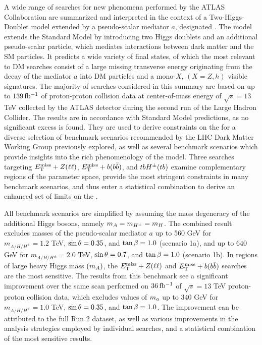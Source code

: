 A wide range of searches for new phenomena performed by the ATLAS Collaboration are summarized and interpreted in the context of a Two-Higgs-Doublet model extended by a pseudo-scalar mediator $a$, designated \hdma. The model extends the Standard Model by introducing two Higgs doublets and an additional pseudo-scalar particle, which mediates interactions between dark matter and the SM particles. It predicts a wide variety of final states, of which the most relevant to DM searches consist of a large missing transverse energy originating from the decay of the mediator $a$ into DM particles and a mono-$X,\,(X=Z,h)$ visible signatures. The majority of searches considered in this summary are based on up to $139\,\mbox{fb\(^{-1}\)}$ of proton-proton collision data at center-of-mass energy of $\sqrt{s}=13$ TeV collected by the ATLAS detector during the second run of the Large Hadron Collider. The results are in accordance with Standard Model predictions, as no significant excess is found. They are used to derive constraints on the \thdma for a diverse selection of benchmark scenarios recommended by the LHC Dark Matter Working Group previously explored, as well as several benchmark scenarios which provide insights into the rich phenomenology of the model. Three searches targeting $E_{\mathrm{T}}^{\mathrm{miss}}+Z(\ell\ell)$, $E_{\mathrm{T}}^{\mathrm{miss}}+b(b\bar{b})$, and $tbH^{\pm}(tb)$ examine complementary regions of the parameter space, provide the most stringent constraints in many benchmark scenarios, and thus enter a statistical combination to derive an enhanced set of limits on the \hdma. 

All benchmark scenarios are simplified by assuming the mass degeneracy of the additional Higgs bosons, namely $m_A=m_{H^{\pm}}=m_H$. The combined result excludes masses of the pseudo-scalar mediator $a$ up to 560 GeV for $m_{A/H/H^{\pm}}=1.2$ TeV, $\sin\theta=0.35$, and $\tan\beta=1.0$ (scenario 1a), and up to $640$ GeV for $m_{A/H/H^{\pm}}=2.0$ TeV, $\sin\theta=0.7$, and $\tan\beta=1.0$ (scenario 1b). In regions of large heavy Higgs mass $(m_A)$, the $E_{\mathrm{T}}^{\mathrm{miss}}+Z(\ell\ell)$ and $E_{\mathrm{T}}^{\mathrm{miss}}+b(b\bar{b})$ searches are the most sensitive. The results from this benchmark see a significant improvement over the same scan performed on $36\,\mbox{fb\(^{-1}\)}$ of $\sqrt{s}=13$ TeV proton-proton collision data, which excludes values of $m_a$ up to 340 GeV for $m_{A/H/H^{\pm}}=1.0$ TeV, $\sin\theta=0.35$, and $\tan\beta=1.0$. The improvement can be attributed to the full Run 2 dataset, as well as various improvements in the analysis strategies employed by individual searches, and a statistical combination of the most sensitive results.

